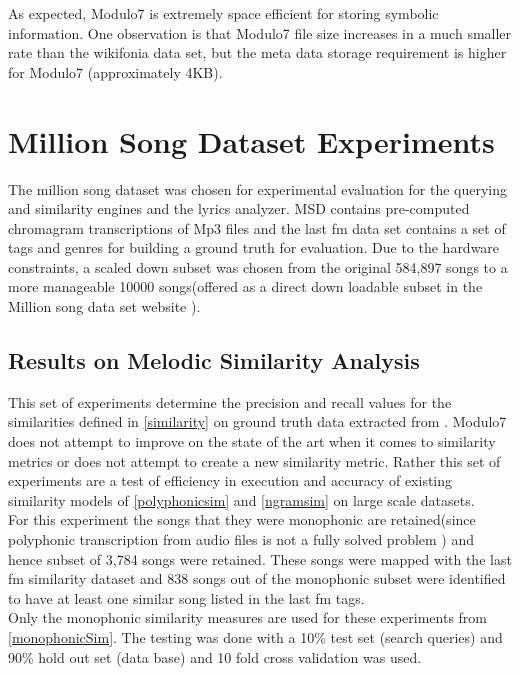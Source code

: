 \noindent As expected, Modulo7 is extremely space efficient for storing symbolic information. One observation is that Modulo7 file size increases in a much smaller rate than the wikifonia data set, but the meta data storage requirement is higher for Modulo7 (approximately 4KB). 
\section{Million Song Dataset Experiments} 

\noindent The million song dataset was chosen for experimental evaluation \cite{msd} for the querying and similarity engines and the lyrics analyzer. MSD contains pre-computed chromagram transcriptions of Mp3 files and the last fm data set contains a set of tags and genres for building a  ground truth for evaluation. Due to the hardware constraints, a scaled down subset was chosen from the original 584,897 songs to a more manageable 10000 songs(offered as a direct down loadable subset in the Million song data set website \cite{msddownloadable}).

\subsection{Results on Melodic Similarity Analysis} \label{msdsimexpts}

\noindent This set of experiments determine the precision and recall values for the similarities defined in \ref{similarity} on ground truth data extracted from \cite{msd}. Modulo7 does not attempt to improve on the state of the art when it comes to similarity metrics or does not attempt to create a new similarity metric. Rather this set of experiments are a test of efficiency in execution and accuracy of existing similarity models of \ref{polyphonicsim} and \ref{ngramsim} on large scale datasets. \\

\noindent For this experiment the songs that they were monophonic are retained(since polyphonic transcription from audio files is not a fully solved problem \cite{melextract}) and hence subset of 3,784 songs were retained. These songs were mapped with the last fm similarity dataset and 838 songs out of the monophonic subset were identified to have at least one similar song listed in the last fm tags. \\

\noindent Only the monophonic similarity measures are used for these experiments from \ref{monophonicSim}. The testing was done with a 10\% test set (search queries) and 90\% hold out set (data base) and 10 fold cross validation was used. \\

